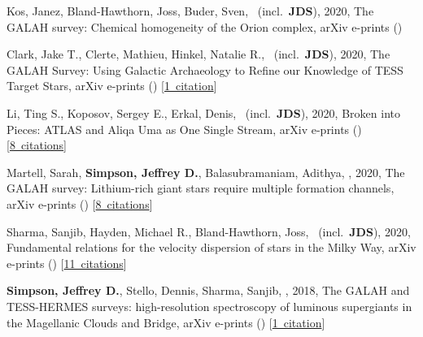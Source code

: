 \item[{\color{numcolor}\scriptsize6}] Kos, Janez, Bland-Hawthorn, Joss, Buder, Sven, \etal\ (incl.\ \textbf{JDS}), 2020, The GALAH survey: Chemical homogeneity of the Orion complex, arXiv e-prints ()

\item[{\color{numcolor}\scriptsize5}] Clark, Jake T., Clerte, Mathieu, Hinkel, Natalie R., \etal\ (incl.\ \textbf{JDS}), 2020, The GALAH Survey: Using Galactic Archaeology to Refine our Knowledge of TESS Target Stars, arXiv e-prints () [\href{https://ui.adsabs.harvard.edu/#abs/2020arXiv200805372C}{1~citation}]

\item[{\color{numcolor}\scriptsize4}] Li, Ting S., Koposov, Sergey E., Erkal, Denis, \etal\ (incl.\ \textbf{JDS}), 2020, Broken into Pieces: ATLAS and Aliqa Uma as One Single Stream, arXiv e-prints () [\href{https://ui.adsabs.harvard.edu/#abs/2020arXiv200610763L}{8~citations}]

\item[{\color{numcolor}\scriptsize3}] Martell, Sarah, \textbf{Simpson, Jeffrey D.}, Balasubramaniam, Adithya, \etal, 2020, The GALAH survey: Lithium-rich giant stars require multiple formation channels, arXiv e-prints () [\href{https://ui.adsabs.harvard.edu/#abs/2020arXiv200602106M}{8~citations}]

\item[{\color{numcolor}\scriptsize2}] Sharma, Sanjib, Hayden, Michael R., Bland-Hawthorn, Joss, \etal\ (incl.\ \textbf{JDS}), 2020, Fundamental relations for the velocity dispersion of stars in the Milky Way, arXiv e-prints () [\href{https://ui.adsabs.harvard.edu/#abs/2020arXiv200406556S}{11~citations}]

\item[{\color{numcolor}\scriptsize1}] \textbf{Simpson, Jeffrey D.}, Stello, Dennis, Sharma, Sanjib, \etal, 2018, The GALAH and TESS-HERMES surveys: high-resolution spectroscopy of luminous supergiants in the Magellanic Clouds and Bridge, arXiv e-prints () [\href{https://ui.adsabs.harvard.edu/#abs/2018arXiv180405900S}{1~citation}]